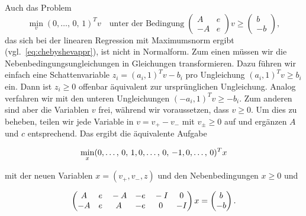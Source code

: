 Auch das Problem
\begin{equation}
  \min_v (0,\ldots,\,0,\,1)^T v\quad\text{unter der Bedingung}\;
  \begin{pmatrix}
    A & e\\
    -A & e
  \end{pmatrix} v \ge
  \begin{pmatrix}
    b\\
    -b
  \end{pmatrix},
\end{equation}
das sich bei der linearen Regression mit Maximumsnorm ergibt
(vgl.~\eqref{eq:chebyshevappr}), ist nicht in Normalform. Zum einen
müssen wir die Nebenbedingungsungleichungen in Gleichungen
transformieren. Dazu führen wir einfach eine Schattenvariable
$z_i=(a_i, 1)^T v - b_i$ pro Ungleichung $(a_i, 1)^T v\ge b_i$ ein. Dann ist
$z_i\ge 0$ offenbar äquivalent zur ursprünglichen Ungleichung.
Analog verfahren wir mit den unteren Ungleichungen $(-a_i, 1)^T v\ge -b_i$.
Zum anderen sind aber die Variablen $v$ frei, während wir voraussetzen,
dass $v\ge 0$. Um dies zu beheben, teilen wir jede Variable in $v=v_+
- v_-$ mit $v_\pm\ge 0$ auf und ergänzen $A$ und $c$ entsprechend. Das
ergibt die äquivalente Aufgabe%
{\samepage\vspace{0.2em}%
  \begin{equation}
    \label{eq:chebyshevapprnf}
    \min_x (\tikzlabel{vpl}0,\ldots,\,0,\,1\tikzlabel{vpr},
    \tikzlabel{vml}0,\ldots,\,0,\,-1\tikzlabel{vmr},
    \tikzlabel{zl}0,\ldots,\,0\tikzlabel{zr})^T x
  \end{equation}
  }
mit der neuen Variablen $x=(v_+,v_-,z)$ und den Nebenbedingungen $x\ge 0$
und
{\samepage\vspace{0.2em}%
\begin{equation*}
  \begin{pmatrix}
    \tikzlabel{vpl}A  & e\tikzlabel{vpr} & 
    \tikzlabel{vml}-A & -e\tikzlabel{vmr} &
    \tikzlabel{zl} -I & 0\tikzlabel{zr}\\
    -A & e &  A & -e & 0 & -I
  \end{pmatrix}
  x =
  \begin{pmatrix}
    b\\
    -b
  \end{pmatrix}.
\end{equation*}
}

